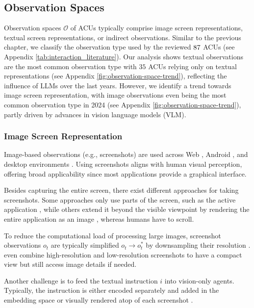 
\subsection{Observation Spaces}\label{sec:obervation_space}

Observation spaces $\mathcal{O}$ of ACUs typically comprise image screen representations, textual screen representations, or indirect observations. 
Similar to the previous chapter, we classify the observation type used by the reviewed $87$ ACUs (see Appendix \cref{tab:interaction_literature}).
Our analysis shows textual observations are the most common observation type with $35$ ACUs relying only on textual representations (see Appendix \cref{fig:observation-space-trend}), reflecting the influence of LLMs over the last years. %
However, we identify a trend towards image screen representation, with image observations even being the most common observation type in 2024 (see Appendix \cref{fig:observation-space-trend}), partly driven by advances in vision language models (VLM).

\subsubsection{Image Screen Representation}\label{sec:obervation_space_image}
Image-based observations (e.g., screenshots) are used across Web , Android , and desktop environments .
Using screenshots aligns with human visual perception, offering broad applicability since most applications provide a graphical interface.

Besides capturing the entire screen, there exist different approaches for taking screenshots. Some approaches only use parts of the screen, such as the active application \citep{gao_assistgui_2024}, while others extend it beyond the visible viewpoint by rendering the entire application as an image \citep{chen_webvln_2024}, whereas humans have to scroll.

To reduce the computational load of processing large images, screenshot observations $o_t$ are typically simplified $o_t \rightarrow o_t^*$ by downsampling their resolution .
\citet{rahman_v-zen_2024} even combine high-resolution and low-resolution screenshots to have a compact view but still access image details if needed.

Another challenge is to feed the textual instruction $i$ into vision-only agents.
Typically, the instruction is either encoded separately and added in the embedding space  or visually rendered atop of each screenshot .

